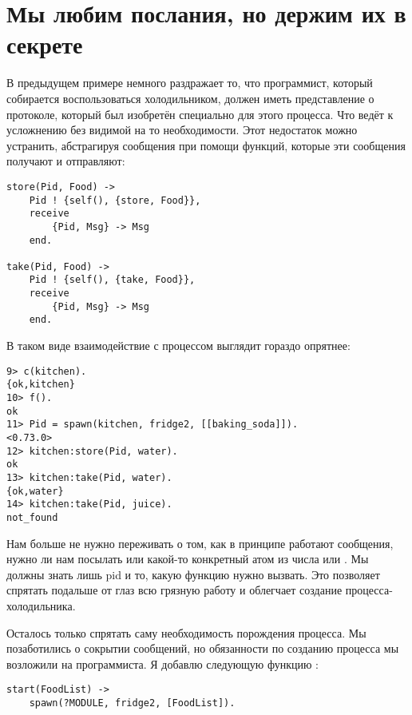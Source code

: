 \section{Мы любим послания, но держим их в секрете}
\label{we-love-messages-but-we-keep-them-secret}
В предыдущем примере немного раздражает то, что программист, который собирается воспользоваться холодильником, должен иметь представление о протоколе, который был изобретён специально для этого процесса.
Что ведёт к усложнению без видимой на то необходимости.
Этот недостаток можно устранить, абстрагируя сообщения при помощи функций, которые эти сообщения получают и отправляют:
\begin{lstlisting}[style=erlang]
store(Pid, Food) ->
    Pid ! {self(), {store, Food}},
    receive
        {Pid, Msg} -> Msg
    end.
 
take(Pid, Food) ->
    Pid ! {self(), {take, Food}},
    receive
        {Pid, Msg} -> Msg
    end.
\end{lstlisting}

В таком виде взаимодействие с процессом выглядит гораздо опрятнее:
\begin{lstlisting}[style=erlang]
9> c(kitchen).
{ok,kitchen}
10> f().
ok
11> Pid = spawn(kitchen, fridge2, [[baking_soda]]).
<0.73.0>
12> kitchen:store(Pid, water).
ok
13> kitchen:take(Pid, water).
{ok,water}
14> kitchen:take(Pid, juice).
not_found
\end{lstlisting}

Нам больше не нужно переживать о том, как в принципе работают сообщения, нужно ли нам посылать  или какой\--то конкретный атом из числа  или .
Мы должны знать лишь pid и то, какую функцию нужно вызвать.
Это позволяет спрятать подальше от глаз всю грязную работу и облегчает создание процесса\--холодильника.

Осталось только спрятать саму необходимость порождения процесса.
Мы позаботились о сокрытии сообщений, но обязанности по созданию процесса мы возложили на программиста.
Я добавлю следующую функцию :
\begin{lstlisting}[style=erlang]
start(FoodList) ->
    spawn(?MODULE, fridge2, [FoodList]).
\end{lstlisting}

